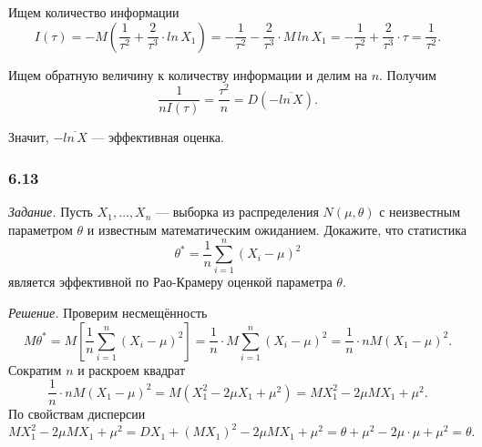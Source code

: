 Ищем количество информации
$$I \left( \tau \right) =
  -M \left( \frac{1}{ \tau^2} + \frac{2}{ \tau^3} \cdot ln \, X_1 \right) =
  - \frac{1}{ \tau^2} - \frac{2}{ \tau^3} \cdot M \, ln \, X_1 =
  - \frac{1}{ \tau^2} + \frac{2}{ \tau^3} \cdot \tau =
  \frac{1}{ \tau^2}.$$

Ищем обратную величину к количеству информации и делим на $n$.
Получим
$$ \frac{1}{nI \left( \tau \right) } =
  \frac{ \tau^2}{n} =
  D \left( - \overline{ln \, X} \right).$$

Значит, $- \overline{ln \, X}$ --- эффективная оценка.

\subsubsection*{6.13}

\textit{Задание.}
Пусть $X_1, \dotsc, X_n$ ---
выборка из распределения $N \left( \mu, \theta \right) $ с неизвестным параметром $ \theta $
и известным математическим ожиданием.
Докажите, что статистика
$$ \theta^* =
  \frac{1}{n} \sum \limits_{i = 1}^n \left( X_i - \mu \right)^2$$
является эффективной по Рао-Крамеру оценкой параметра $ \theta $.

\textit{Решение.} Проверим несмещённость
$$M \theta^* =
  M \left[ \frac{1}{n} \sum \limits_{i = 1}^n \left( X_i - \mu \right)^2 \right] =
  \frac{1}{n} \cdot M \sum \limits_{i = 1}^n \left( X_i - \mu \right)^2 =
  \frac{1}{n} \cdot nM \left( X_1 - \mu \right)^2.$$
Сократим $n$ и раскроем квадрат
$$ \frac{1}{n} \cdot nM \left( X_1 - \mu \right)^2 =
  M \left( X_1^2 - 2\mu X_1 + \mu^2 \right) =
  MX_1^2 - 2 \mu MX_1 + \mu^2.$$
По свойствам дисперсии
$$MX_1^2 - 2 \mu MX_1 + \mu^2 =
  DX_1 + \left( MX_1 \right)^2 - 2 \mu MX_1 + \mu^2 =
  \theta + \mu^2 - 2 \mu \cdot \mu + \mu^2 =
  \theta.$$

